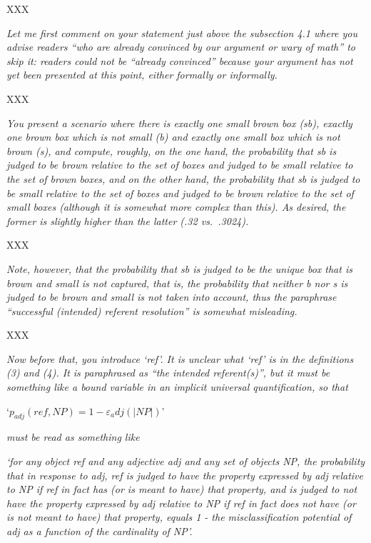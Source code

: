 \documentclass[12pt]{article}
\begin{document}
XXX
	
\item \emph{Let me first comment on your statement just above the subsection 4.1 where
	you advise readers ``who are already convinced by our argument or wary of
	math'' to skip it: readers could not be ``already convinced'' because your
	argument has not yet been presented at this point, either formally or
	informally.}

XXX
	
\item \emph{You present a scenario where there is exactly one small brown box (sb),
	exactly one brown box which is not small (b) and exactly one small box which
	is not brown (s), and compute, roughly, on the one hand, the probability
	that sb is judged to be brown relative to the set of boxes and judged to be
	small relative to the set of brown boxes, and on the other hand, the
	probability that sb is judged to be small relative to the set of boxes and
	judged to be brown relative to the set of small boxes (although it is
	somewhat more complex than this). As desired, the former is slightly higher
	than the latter (.32 vs.~.3024).}

XXX 
	
\item \emph{Note, however, that the probability that sb is judged to be the unique box
	that is brown and small is not captured, that is, the probability that
	neither b nor s is judged to be brown and small is not taken into account,
	thus the paraphrase ``successful (intended) referent resolution'' is somewhat
	misleading.}

XXX
	
\item \emph{Now before that, you introduce `ref'. It is unclear what `ref' is in the
	definitions (3) and (4). It is paraphrased as ``the intended referent(s)'',
	but it must be something like a bound variable in an implicit universal
	quantification, so that} 
	
	`$p_{adj}(ref, NP) = 1 -  \varepsilon_adj(|NP|)$'
	
	\emph{must be read as something like}
	
	\emph{`for any object ref and any adjective adj and any set of objects NP, the
	probability that in response to adj, ref is judged to have the property
	expressed by adj relative to NP if ref in fact has (or is meant to have)
	that property, and is judged to not have the property expressed by adj
	relative to NP if ref in fact does not have (or is not meant to have) that
	property, equals 1 - the misclassification potential of adj as a function of
	the cardinality of NP'.}
\end{document}
